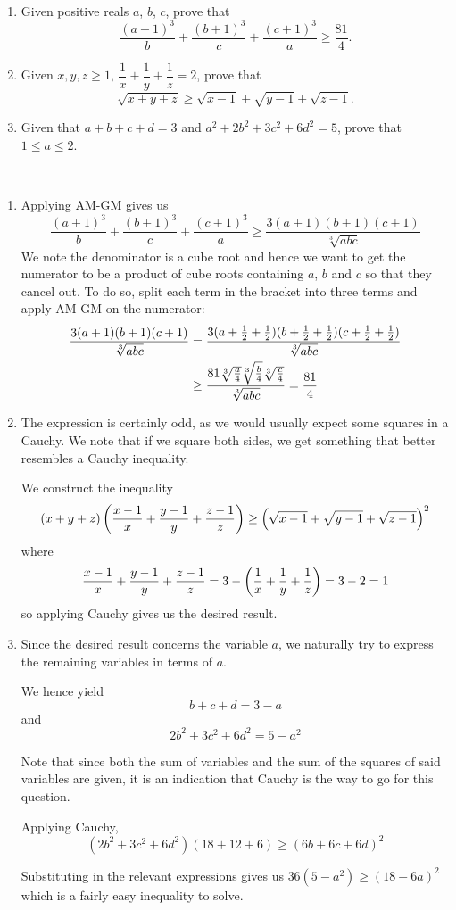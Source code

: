 \begin{prbm} \
\begin{enumerate}[label=(\alph*)]
\item Given positive reals $a$, $b$, $c$, prove that 
\[ \frac{(a+1)^3}{b}+\frac{(b+1)^3}{c}+\frac{(c+1)^3}{a} \ge \frac{81}{4}. \]

\item Given $x,y,z\ge 1$, $\dfrac{1}{x}+\dfrac{1}{y}+\dfrac{1}{z}=2$, prove that
\[ \sqrt{x+y+z} \ge \sqrt{x-1}+\sqrt{y-1}+\sqrt{z-1}. \]

\item Given that $a+b+c+d=3$ and $a^2+2b^2+3c^2+6d^2=5$, prove that $1\le a\le 2$.
\end{enumerate}
\end{prbm}

\begin{solution} \
\begin{enumerate}[label=(\alph*)]
\item Applying AM-GM gives us
\[ \frac{(a+1)^3}{b}+\frac{(b+1)^3}{c}+\frac{(c+1)^3}{a} \ge \frac{3(a+1)(b+1)(c+1)}{\sqrt[3]{abc}} \]
We note the denominator is a cube root and hence we want to get the numerator to be a product of cube roots containing $a$, $b$ and $c$ so that they cancel out. To do so, split each term in the bracket into three terms and apply AM-GM on the numerator:
\begin{align*}
\frac{3(a+1)(b+1)(c+1)}{\sqrt[3]{abc}} 
&= \frac{3(a+\frac{1}{2}+\frac{1}{2})(b+\frac{1}{2}+\frac{1}{2})(c+\frac{1}{2}+\frac{1}{2})}{\sqrt[3]{abc}} \\
&\ge \frac{81\sqrt[3]{\frac{a}{4}}\sqrt[3]{\frac{b}{4}}\sqrt[3]{\frac{c}{4}}}{\sqrt[3]{abc}}=\frac{81}{4}
\end{align*}

\item The expression is certainly odd, as we would usually expect some squares in a Cauchy. We note that if we square both sides, we get something that better resembles a Cauchy inequality.

We construct the inequality 
\[ (x+y+z)\left(\frac{x-1}{x}+\frac{y-1}{y}+\frac{z-1}{z}\right) \ge \left(\sqrt{x-1}+\sqrt{y-1}+\sqrt{z-1}\right)^2 \]
where
\[ \frac{x-1}{x}+\frac{y-1}{y}+\frac{z-1}{z}=3 - \left(\frac{1}{x}+\frac{1}{y}+\frac{1}{z}\right)=3-2=1 \]
so applying Cauchy gives us the desired result.

\item Since the desired result concerns the variable $a$, we naturally try to express the remaining variables in terms of $a$. 

We hence yield
\[ b+c+d=3-a \]
and
\[ 2b^2+3c^2+6d^2=5-a^2 \]

Note that since both the sum of variables and the sum of the squares of said variables are given, it is an indication that Cauchy is the way to go for this question.

Applying Cauchy,
\[ (2b^2+3c^2+6d^2)(18+12+6) \ge (6b+6c+6d)^2 \]

Substituting in the relevant expressions gives us $36(5-a^2)\ge (18-6a)^2$ which is a fairly easy inequality to solve.
\end{enumerate}
\end{solution}
\pagebreak

